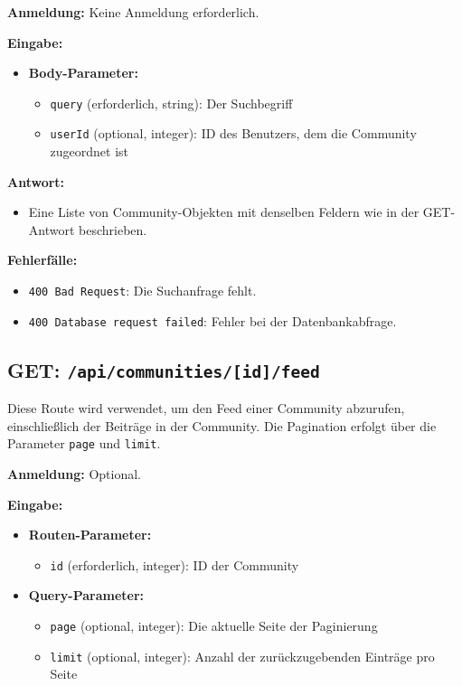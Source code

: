 \documentclass[a4paper,12pt]{article}
\begin{document}
\textbf{Anmeldung:} Keine Anmeldung erforderlich.

\textbf{Eingabe:}
\begin{itemize}
    \item \textbf{Body-Parameter:}
    \begin{itemize}
        \item \texttt{query} (erforderlich, string):
            Der Suchbegriff
        \item \texttt{userId} (optional, integer):
            ID des Benutzers, dem die Community zugeordnet ist
    \end{itemize}
\end{itemize}

\textbf{Antwort:}
\begin{itemize}
    \item Eine Liste von Community-Objekten mit denselben Feldern wie in der
        GET-Antwort beschrieben.
\end{itemize}

\textbf{Fehlerfälle:}
\begin{itemize}
    \item \texttt{400 Bad Request}:
        Die Suchanfrage fehlt.
    \item \texttt{400 Database request failed}:
        Fehler bei der Datenbankabfrage.
\end{itemize}

\newpage
\subsection{GET: \texttt{/api/communities/[id]/feed}}

Diese Route wird verwendet, um den Feed einer Community abzurufen,
einschließlich der Beiträge in der Community. Die Pagination erfolgt über die
Parameter \texttt{page} und \texttt{limit}.

\textbf{Anmeldung:} Optional.

\textbf{Eingabe:}
\begin{itemize}
    \item \textbf{Routen-Parameter:}
    \begin{itemize}
        \item \texttt{id} (erforderlich, integer):
            ID der Community
    \end{itemize}
    \item \textbf{Query-Parameter:}
    \begin{itemize}
        \item \texttt{page} (optional, integer):
            Die aktuelle Seite der Paginierung
        \item \texttt{limit} (optional, integer):
            Anzahl der zurückzugebenden Einträge pro Seite
    \end{itemize}
\end{itemize}
\end{document}
